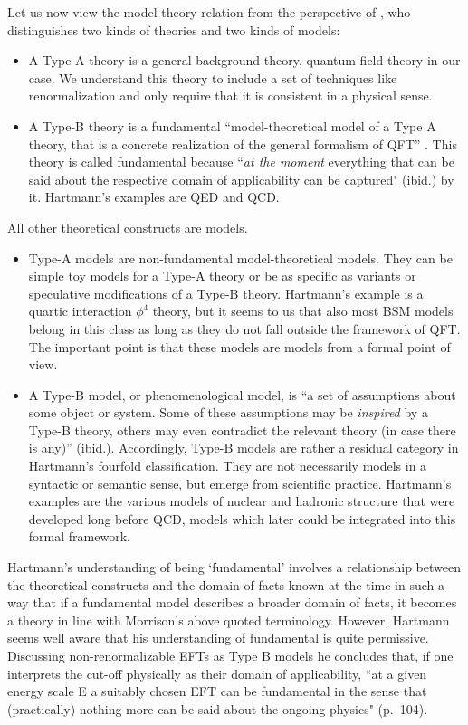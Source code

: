 Let us now view the model-theory relation from the perspective of \citet{hartmann1998}, who distinguishes two kinds of theories and two kinds of models:
\begin{itemize}
\item A Type-A theory is a general background theory, quantum field theory in our case. We understand this theory to include a set of techniques like renormalization and only require that it is consistent in a physical sense. 
\item A Type-B theory is a fundamental ``model-theoretical model of a Type A theory, that is a concrete realization of the general formalism of QFT'' \citep[][p.~101]{hartmann1998}. This theory is called fundamental because ``{\it at the moment} everything that can be said about the respective domain of applicability can be captured" (ibid.) by it. 
Hartmann's examples are QED and QCD.
\end{itemize}
All other theoretical constructs are models. 


\begin{itemize}
\item Type-A models are non-fundamental model-theoretical models. They can be simple toy models for a Type-A theory or be as specific as variants or speculative modifications of a Type-B theory. 
Hartmann's example is a quartic interaction $\phi^4$ theory, but it seems to us that also most BSM models belong in this class as long as they do not fall outside the framework of QFT. 
The important point is that these models are models from a formal point of view. 

\item A Type-B model, or phenomenological model, is ``a set of assumptions about some object or system. Some of these assumptions may be \emph{inspired} by a Type-B theory, others may even contradict the relevant theory (in case there is any)'' (ibid.). Accordingly, Type-B models are rather a residual category in Hartmann's fourfold classification. 
They are not necessarily models in a syntactic or semantic sense, but emerge from scientific practice. 
Hartmann's examples are the various models of nuclear and hadronic structure that were developed long before QCD, models which later could be integrated into this formal framework. 
\end{itemize}

Hartmann's understanding of being `fundamental' involves a relationship between the theoretical constructs and the domain of facts known at the time in such a way that if a fundamental model describes a broader domain of facts, it becomes a theory in line with Morrison's above quoted terminology. However, Hartmann seems well aware that his understanding of fundamental is quite permissive. Discussing non-renormalizable EFTs as Type B models he concludes that, if one interprets the cut-off physically as their domain of applicability, ``at a given energy scale E a suitably chosen EFT can be fundamental in the sense that (practically) nothing more can be said about the ongoing physics" (p.~104).

